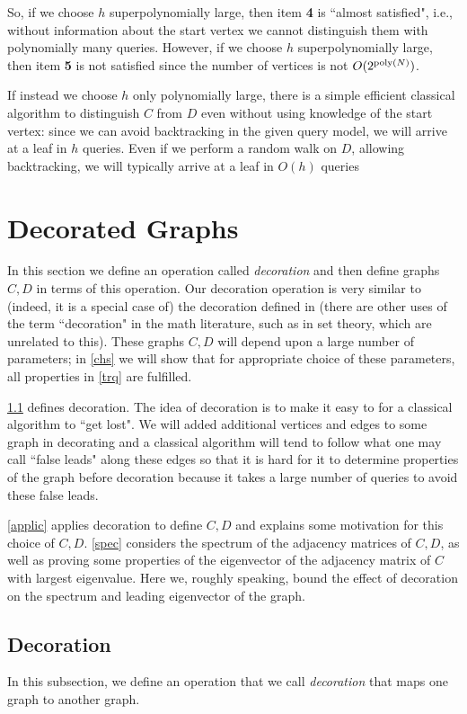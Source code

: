\documentclass[letterpaper,onecolumn]{quantumarticle}
\newcommand{\poly}{{\rm poly}}
\begin{document}
So, if we choose $h$ superpolynomially large, then item {\bf 4} is ``almost satisfied", i.e., without information about the start vertex we cannot distinguish them with polynomially many queries.
However, if we choose $h$ superpolynomially large, then item {\bf 5} is not satisfied since the number of vertices is not $O(2^{\poly(N)})$.

If instead we choose $h$ only polynomially large,
there is a simple efficient classical algorithm to distinguish $C$ from $D$ even without using knowledge of the start vertex: since we can avoid backtracking in the given query model, we will arrive at a leaf in $h$ queries.  Even if we perform a random walk on $D$, allowing backtracking, we will typically arrive at a leaf in $O(h)$ queries


\section{Decorated Graphs}
\label{decg}
In this section we define an operation called {\it decoration} and then define graphs $C,D$ in terms of this operation.  Our decoration operation is very similar to (indeed, it is a special case of) the decoration defined in \cite{Schenker_2000} (there are other uses of the term ``decoration" in the math literature, such as in set theory, which are unrelated to this).
 These graphs $C,D$ will depend upon a large number of parameters; in \cref{chs} we will show that for appropriate choice of these parameters, all properties in \cref{trq} are fulfilled.
 
 \cref{decdef} defines decoration.  
 The idea of decoration is to make it easy to for a classical algorithm to ``get lost".  We will added additional vertices and edges to some graph in decorating and a classical algorithm will tend to follow what one may call ``false leads" along these edges so that it is hard for it to determine properties of the graph before decoration because it takes a large number of queries to avoid these false leads.
  
  \cref{applic} applies decoration to define $C,D$ and explains some motivation for this choice of $C,D$.  \cref{spec} considers the spectrum of the adjacency matrices of $C,D$, as well as proving some properties of the eigenvector of the adjacency matrix of $C$ with largest eigenvalue.  Here we, roughly speaking, bound the effect of decoration on the spectrum and leading eigenvector of the graph.
 
\subsection{Decoration}
\label{decdef}
In this subsection, we define an operation that we call {\it decoration} that maps one graph to another graph.
\end{document}
